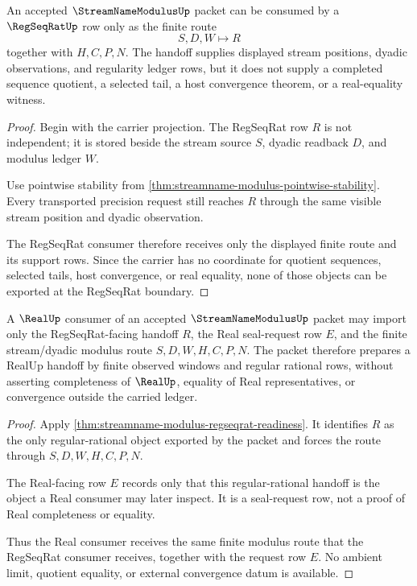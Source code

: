 \begin{theorem}
\label{thm:streamname-modulus-regseqrat-readiness}
An accepted $\StreamNameModulusUp$ packet can be consumed by a
$\RegSeqRatUp$ row only as the finite route
$$
S,D,W \longmapsto R
$$
together with $H,C,P,N$. The handoff supplies displayed stream positions,
dyadic observations, and regularity ledger rows, but it does not supply a
completed sequence quotient, a selected tail, a host convergence theorem, or a
real-equality witness.
\end{theorem}
\begin{proof}
Begin with the carrier projection. The RegSeqRat row $R$ is not independent;
it is stored beside the stream source $S$, dyadic readback $D$, and modulus
ledger $W$.

Use pointwise stability from
\autoref{thm:streamname-modulus-pointwise-stability}. Every transported
precision request still reaches $R$ through the same visible stream position
and dyadic observation.

The RegSeqRat consumer therefore receives only the displayed finite route and
its support rows. Since the carrier has no coordinate for quotient sequences,
selected tails, host convergence, or real equality, none of those objects can
be exported at the RegSeqRat boundary.
\end{proof}

\begin{theorem}
\label{thm:streamname-modulus-real-handoff}
A $\RealUp$ consumer of an accepted $\StreamNameModulusUp$ packet may import
only the RegSeqRat-facing handoff $R$, the Real seal-request row $E$, and the
finite stream/dyadic modulus route $S,D,W,H,C,P,N$. The packet therefore
prepares a RealUp handoff by finite observed windows and regular rational
rows, without asserting completeness of $\RealUp$, equality of Real
representatives, or convergence outside the carried ledger.
\end{theorem}
\begin{proof}
Apply \autoref{thm:streamname-modulus-regseqrat-readiness}. It identifies
$R$ as the only regular-rational object exported by the packet and forces the
route through $S,D,W,H,C,P,N$.

The Real-facing row $E$ records only that this regular-rational handoff is the
object a Real consumer may later inspect. It is a seal-request row, not a proof
of Real completeness or equality.

Thus the Real consumer receives the same finite modulus route that the
RegSeqRat consumer receives, together with the request row $E$. No ambient
limit, quotient equality, or external convergence datum is available.
\end{proof}

